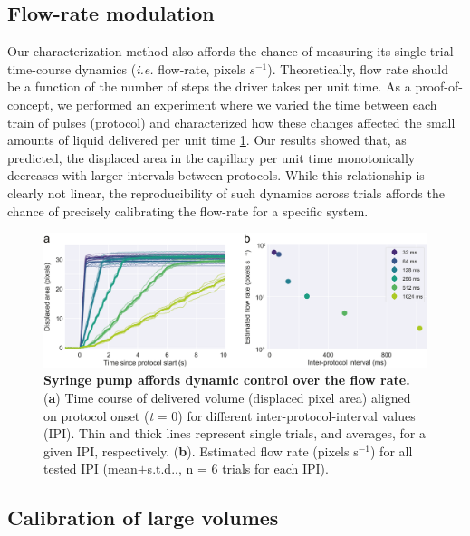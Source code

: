 \subsection*{Flow-rate modulation}
Our characterization method also affords the chance of measuring its single-trial time-course dynamics (\textit{i.e.} flow-rate, pixels $s^{-1}$). Theoretically, flow rate should be a function of the number of steps the driver takes per unit time. As a proof-of-concept, we performed an experiment where we varied the time between each train of pulses (protocol) and characterized how these changes affected the small amounts of liquid delivered per unit time \cref{fig:FlowRateControl}. Our results showed that, as predicted, the displaced area in the capillary per unit time monotonically decreases with larger intervals between protocols. While this relationship is clearly not linear, the reproducibility of such dynamics across trials affords the chance of precisely calibrating the flow-rate for a specific system.

\begin{figure}
	\centering
	\includegraphics[width=1.0\linewidth]{Figures/Artboard 3.pdf}
	\caption{\textbf{Syringe pump affords dynamic control over the flow rate.}\\
		(\textbf{a}) Time course of delivered volume (displaced pixel area) aligned on protocol onset (\textit{t} = 0) for different inter-protocol-interval values (IPI). Thin and thick lines represent single trials, and averages, for a given IPI, respectively. (\textbf{b}). Estimated flow rate (pixels s$^{-1}$) for all tested IPI (mean$\pm$s.t.d.., n = 6 trials for each IPI).}
	\label{fig:FlowRateControl} 
\end{figure}

\subsection*{Calibration of large volumes} 


